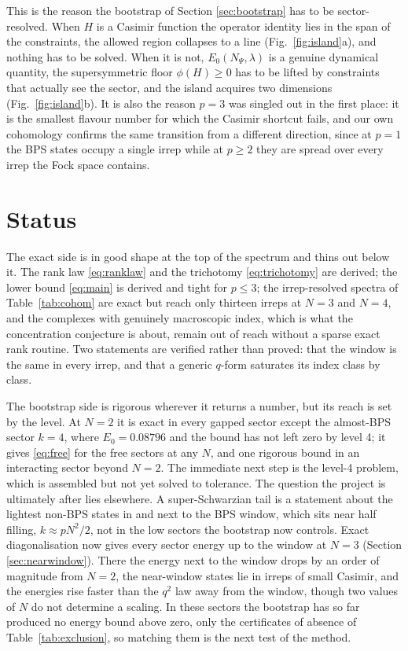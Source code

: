 \documentclass[10pt]{article}
\begin{document}
This is the reason the bootstrap of Section \ref{sec:bootstrap} has to be sector-resolved. When $H$ is a Casimir
function the operator identity lies in the span of the constraints, the allowed region collapses to a line
(Fig.~\ref{fig:island}a), and nothing has to be solved. When it is not, $E_0(N_\Psi,\lambda)$ is a genuine
dynamical quantity, the supersymmetric floor $\phi(H)\ge0$ has to be lifted by constraints that actually see the
sector, and the island acquires two dimensions (Fig.~\ref{fig:island}b). It is also the reason $p=3$ was singled
out in the first place: it is the smallest flavour number for which the Casimir shortcut fails, and our own
cohomology confirms the same transition from a different direction, since at $p=1$ the BPS states occupy a single
irrep while at $p\ge2$ they are spread over every irrep the Fock space contains.

\section{Status}

The exact side is in good shape at the top of the spectrum and thins out below it. The rank law
\eqref{eq:ranklaw} and the trichotomy \eqref{eq:trichotomy} are derived; the lower bound \eqref{eq:main} is
derived and tight for $p\le3$; the irrep-resolved spectra of Table~\ref{tab:cohom} are exact but reach only
thirteen irreps at $N=3$ and $N=4$, and the complexes with genuinely macroscopic index, which is what the
concentration conjecture is about, remain out of reach without a sparse exact rank routine. Two statements are
verified rather than proved: that the window is the same in every irrep, and that a generic $q$-form saturates
its index class by class.

The bootstrap side is rigorous wherever it returns a number, but its reach is set by the level. At $N=2$ it is
exact in every gapped sector except the almost-BPS sector $k=4$, where $E_0=0.08796$ and the bound has not left
zero by level 4; it gives \eqref{eq:free} for the free sectors at any $N$, and one rigorous bound in an
interacting sector beyond $N=2$. The immediate next step is the level-4 problem, which is assembled but not yet
solved to tolerance. The question the project is ultimately after lies elsewhere. A super-Schwarzian tail is a
statement about the lightest non-BPS states in and next to the BPS window, which sits near half filling,
$k\approx pN^2/2$, not in the low sectors the bootstrap now controls. Exact diagonalisation now gives every
sector energy up to the window at $N=3$ (Section \ref{sec:nearwindow}). There the energy next to the window
drops by an order of magnitude from $N=2$, the near-window states lie in irreps of small Casimir, and the energies
rise faster than the $q^2$ law away from the window, though two values of $N$ do not determine a scaling. In
these sectors the bootstrap has so far produced no energy bound above zero, only the certificates of absence of
Table~\ref{tab:exclusion}, so matching them is the next test of the method.
\end{document}
